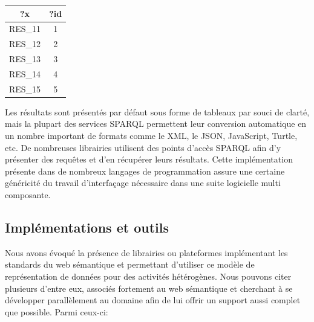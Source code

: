 \begin{center}
 \begin{tabular}{|c | c|} 
 \hline
 ?x & ?id \\ [0.5ex] 
 \hline
 RES\_11 & 1 \\ 
 RES\_12 & 2 \\
 RES\_13 & 3 \\
 RES\_14 & 4 \\
 RES\_15 & 5 \\
 \hline
\end{tabular}
\end{center}

Les résultats sont présentés par défaut sous forme de tableaux par souci de clarté, mais la plupart des services SPARQL permettent leur conversion automatique en un nombre important de formats comme le XML, le JSON, JavaScript, Turtle, etc.
De nombreuses librairies utilisent des points d'accès SPARQL afin d'y présenter des requêtes et d'en récupérer leurs résultats. Cette implémentation présente dans de nombreux langages de programmation assure une certaine généricité du travail d'interfaçage nécessaire dans une suite logicielle multi composante.

\subsection{Implémentations et outils} \label{web_semantic_tools}

Nous avons évoqué la présence de librairies ou plateformes implémentant les standards du web sémantique et permettant d'utiliser ce modèle de représentation de données pour des activités hétérogènes. Nous pouvons citer plusieurs d'entre eux, associés fortement au web sémantique et cherchant à se développer parallèlement au domaine afin de lui offrir un support aussi complet que possible. Parmi ceux-ci:

